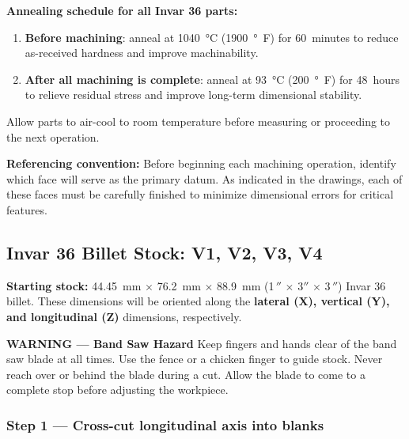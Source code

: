 \documentclass[12pt, letterpaper]{report}%
\newcounter{mycounter}           %
\newcounter{sub}[mycounter]      %
\begin{document}
\begin{appendices}
	\textbf{Annealing schedule for all Invar 36 parts:}
	\begin{enumerate}[itemsep=2pt]
		\item \textbf{Before machining}: anneal at
					\SI{1040}{\degreeCelsius} (\SI{1900}{\degree F}) for 60~minutes to
					reduce as-received hardness and improve machinability\cite[p.~6]{ref_Carpenter_Inv}.
		\item \textbf{After all machining is complete}: anneal at
					\SI{93}{\degreeCelsius} (\SI{200}{\degree F}) for 48~hours to relieve
					residual stress and improve long-term dimensional
					stability\cite[p.~6]{ref_Carpenter_Inv}.
	\end{enumerate}
	Allow parts to air-cool to room temperature before measuring or proceeding to the
	next operation.

	\textbf{Referencing convention:}
	Before beginning each machining operation, identify which face will serve as the
	primary datum. As indicated in the drawings, each of these faces must be carefully
	finished to minimize dimensional errors for critical features.

	\subsection{Invar 36 Billet Stock: V1, V2, V3, V4}
	\label{sec:mfg:invar}

	\textbf{Starting stock:}
	\SI{44.45}{mm} $\times$ \SI{76.2}{mm} $\times$ \SI{88.9}{mm}
	(1\,$''$ $\times$ 3$''$ $\times$ 3\,$''$) Invar 36 billet.
	These dimensions will be oriented along the \textbf{lateral (X), vertical (Y), and
	longitudinal (Z)} dimensions, respectively.

	\begin{warningbox}
	\textbf{\textcolor{warnred}{WARNING --- Band Saw Hazard}}
	Keep fingers and hands clear of the band saw blade at all times. Use the fence or a
	chicken finger to guide stock. Never reach over or behind the blade during a cut. Allow the
	blade to come to a complete stop before adjusting the workpiece.
	\end{warningbox}

	\subsubsection{Step 1 --- Cross-cut longitudinal axis into blanks}


\end{appendices}
\end{document}
